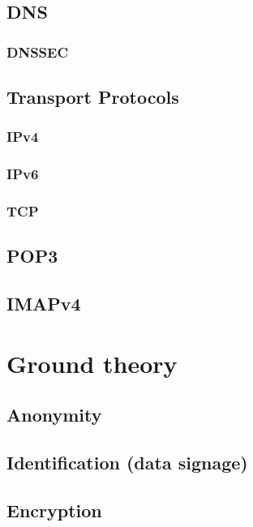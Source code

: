 \documentclass[11pt,a4paper]{book}
\begin{document}
\subsection{DNS}
\cite{RFC2929}
\subsubsection{DNSSEC}
\cite{RFC5155}

\subsection{Transport Protocols}
\subsubsection{IPv4}
\cite{RFC760}
\cite{RFC791}
\cite{RFC1180}
\cite{RFC792}
\cite{RFC919}
\cite{RFC922}
\cite{RFC950}
\cite[p.~3]{RFC793}

\subsubsection{IPv6}
\cite{RFC2460}

\subsubsection{TCP}

\subsection{POP3}
\cite{RFC1939}

\subsection{IMAPv4}
\cite{RFC3501}

\section{Ground theory}
\subsection{Anonymity}
\subsection{Identification (data signage)}
\subsection{Encryption}
\end{document}
